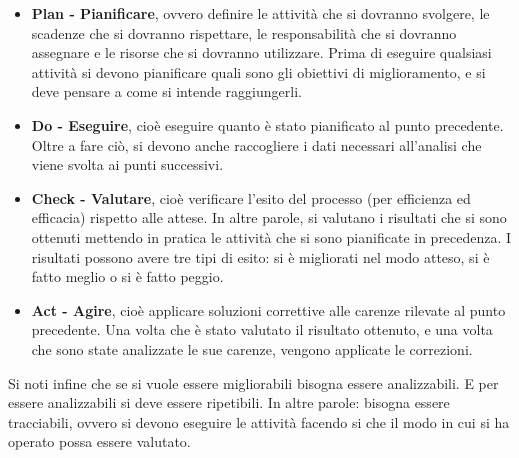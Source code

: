 \begin{itemize}
	\item \textbf{Plan - Pianificare}, ovvero definire le attività che si dovranno svolgere, le scadenze che si dovranno rispettare, le responsabilità che si dovranno assegnare e le risorse che si dovranno utilizzare. Prima di eseguire qualsiasi attività si devono pianificare quali sono gli obiettivi di miglioramento, e si deve pensare a come si intende raggiungerli.
	\item \textbf{Do - Eseguire}, cioè eseguire quanto è stato pianificato al punto precedente. Oltre a fare ciò, si devono anche raccogliere i dati necessari all'analisi che viene svolta ai punti successivi.
	\item \textbf{Check - Valutare}, cioè verificare l'esito del processo (per efficienza ed efficacia) rispetto alle attese. In altre parole, si valutano i risultati che si sono ottenuti mettendo in pratica le attività che si sono pianificate in precedenza. I risultati possono avere tre tipi di esito: si è migliorati nel modo atteso, si è fatto meglio o si è fatto peggio.
	\item \textbf{Act - Agire}, cioè applicare soluzioni correttive alle carenze rilevate al punto precedente. Una volta che è stato valutato il risultato ottenuto, e una volta che sono state analizzate le sue carenze, vengono applicate le correzioni.
\end{itemize}
Si noti infine che se si vuole essere migliorabili bisogna essere analizzabili. E per essere analizzabili si deve essere ripetibili. In altre parole: bisogna essere tracciabili, ovvero si devono eseguire le attività facendo si che il modo in cui si ha operato possa essere valutato.